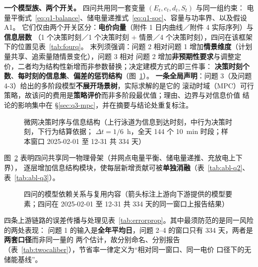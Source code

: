 \textbf{一个模型族、两个开关。} 四问共用同一套变量 \((E_t,c_t,d_t,S_t)\) 与同一组约束：
电量平衡式~\eqref{eq:q1-balance}、储电量递推式~\eqref{eq:q1-soc}、容量与功率界、以及假设 A1。
它们仅由两个开关区分：\textbf{电价向量}（附件 1 日内曲线／附件 4 实际序列）与\textbf{信息层数}
（1 个决策时刻／1 个决策时刻 \(+\) 情景／4 个决策时刻），四问在该框架下的位置见表~\ref{tab:fourq}。
末列须强调：问题 2 相对问题 1 增加\textbf{情景维度}（计划量共享、追索量随情景变化），问题 3 相对
问题 2 增加\textbf{非预期性要求}与调整定价，二者均为结构性新增而非参数替换；决定建模方式的即三件事：
\textbf{决策时刻个数}、\textbf{每时刻的信息集}、\textbf{偏差的惩罚结构}（图~\ref{fig:timeline}）。
\textbf{一条全局声明}：问题 3（及问题 4-3）给出的多阶段模型\textbf{不展开场景树}，实际求解的是它的
滚动时域（MPC）可行策略，故该问的费用是\textbf{策略评价}而非多阶段最优值；理由、边界与对信息价值
结论的影响集中在 \S\ref{sec:q3-mpc}，并在摘要与结论处重复标注。

\begin{figure}[htbp]
  \centering
  
  \caption{微网决策时序与信息结构（上行泳道为信息到达时刻，中行为决策时刻，下行为结算依据；
            \(\Delta t=1/6\)~h，全天 144 个 10~min 时段；样本窗口 2025-02-01 至 12-31 共 334 天）}
  \label{fig:timeline}
\end{figure}

图~\ref{fig:dependency} 表明四问共享同一物理骨架（并网点电量平衡、储电量递推、充放电上下界），
逐层增加信息结构模块，使每层新增贡献可被\textbf{单独消融}（表~\ref{tab:abl-q2}、表~\ref{tab:abl-q3}）。

\begin{figure}[htbp]
  \centering
  
  \caption{四问的模型依赖关系与复用内容（箭头标注上游向下游提供的模型要素；四问在 2025-02-01 至
            12-31 共 334 天的同一窗口上报告结果）}
  \label{fig:dependency}
\end{figure}

四条上游链路的误差传播与处理见表~\ref{tab:errorprop}。其中最须防范的是同一风险的两处表现：
问题 1 的输入是\textbf{全年平均日}，问题 2--4 的窗口只有 334 天，两者是\textbf{两套口径}而非同一量的
两个估计，故分别命名、分别报告（表~\ref{tab:twocaliber}），节省率一律定义为“相对同一窗口、同一电价
口径下的无储能基线”。

